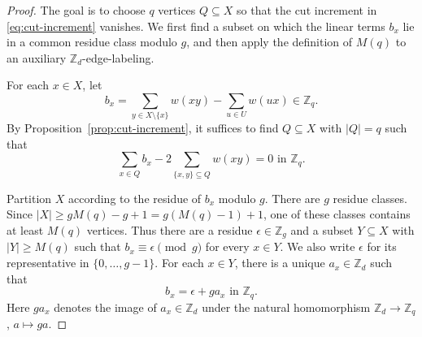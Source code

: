 ﻿\documentclass[11pt]{article}
\numberwithin{equation}{section}
\theoremstyle{remark}
\newcommand{\Z}{\mathbb Z}
\begin{document}
\begin{proof}
    The goal is to choose $q$ vertices $Q\subseteq X$ so that the cut increment in \eqref{eq:cut-increment} vanishes.
    We first find a subset on which the linear terms $b_x$ lie in a common residue class modulo $g$, and then apply the definition of $M(q)$ to an auxiliary $\Z_d$-edge-labeling.

    For each $x\in X$, let
    \[
        b_x=\sum_{y\in X\setminus\{x\}}w(xy)-\sum_{u\in U}w(ux)\in\Z_q.
    \]
    By Proposition~\ref{prop:cut-increment}, it suffices to find $Q\subseteq X$ with $|Q|=q$ such that
    \[
        \sum_{x\in Q}b_x-2\sum_{\{x,y\}\subseteq Q}w(xy)=0
        \text{ in }\Z_q.
    \]

    Partition \(X\) according to the residue of \(b_x\) modulo \(g\).
    There are \(g\) residue classes.
    Since $|X|\ge gM(q)-g+1=g(M(q)-1)+1$, one of these classes contains at least \(M(q)\) vertices.
    Thus there are a residue \(\epsilon\in\Z_g\) and a subset \(Y\subseteq X\) with \(|Y|\ge M(q)\) such that $b_x\equiv \epsilon\pmod g$ for every \(x\in Y\).
    We also write $\epsilon$ for its representative in $\{0,\ldots,g-1\}$.
    For each $x\in Y$, there is a unique $a_x\in\Z_d$ such that
    \begin{equation}\label{eq:b-decomposition}
        b_x=\epsilon+ga_x
        \text{ in }\Z_q.
    \end{equation}
    Here $ga_x$ denotes the image of $a_x\in\Z_d$ under the natural homomorphism $\Z_d\to\Z_q$, $a\mapsto ga$.


\end{proof}
\end{document}
